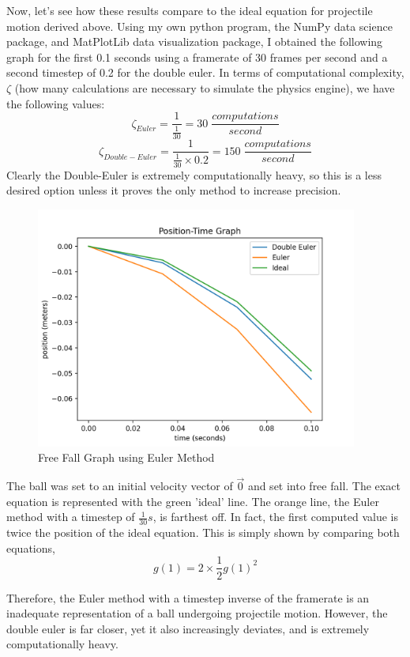 \documentclass[12pt]{article}
\begin{document}
Now, let's see how these results compare to the ideal equation for projectile motion derived above. Using my own python program, the NumPy data science package, and MatPlotLib data visualization package, I obtained the following graph for the first 0.1 seconds using a framerate of 30 frames per second and a second timestep of 0.2 for the double euler. In terms of computational complexity, $\zeta$ (how many calculations are necessary to simulate the physics engine), we have the following values: 
$$\zeta_{Euler} = \frac{1}{\frac{1}{30}} = 30 \; \frac{computations}{second}$$
$$\zeta_{Double-Euler} = \frac{1}{\frac{1}{30} \times 0.2} = 150 \; \frac{computations}{second}$$
Clearly the Double-Euler is extremely computationally heavy, so this is a less desired option unless it proves the only method to increase precision.

\begin{figure}[H]
\centering
\includegraphics[width=300pt]{img/euler.png}
\caption{\label{fig:1}Free Fall Graph using Euler Method}
\end{figure}

The ball was set to an initial velocity vector of $\vec 0$ and set into free fall. The exact equation is represented with the green 'ideal' line. The orange line, the Euler method with a timestep of $\frac{1}{30}s$, is farthest off. In fact, the first computed value is twice the position of the ideal equation. This is simply shown by comparing both equations, 
$$g(1) = 2 \times \frac{1}{2}g(1)^2$$

Therefore, the Euler method with a timestep inverse of the framerate is an inadequate representation of a ball undergoing projectile motion. However, the double euler is far closer, yet it also increasingly deviates, and is extremely computationally heavy. 
\end{document}
